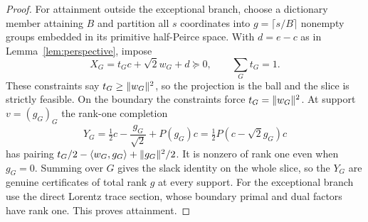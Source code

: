\begin{proof}
For attainment outside the exceptional branch, choose a dictionary member
attaining $B$ and partition all $s$ coordinates into
$g=\lceil s/B\rceil$ nonempty groups embedded in its primitive half-Peirce
space. With $d=e-c$ as in Lemma~\ref{lem:perspective}, impose
\begin{equation}\label{eq:fixed-tail}
 X_G=t_Gc+\sqrt2 w_G+d\succeq0,
 \qquad\sum_Gt_G=1.
\end{equation}
These constraints say $t_G\geq\lVert w_G\rVert^2$, so the projection is the
ball and the slice is strictly feasible. On the boundary the constraints
force $t_G=\lVert w_G\rVert^2$. At support $v=(g_G)_G$ the rank-one completion
\[
 Y_G=\tfrac12 c-\frac{g_G}{\sqrt2}+P(g_G)c
     =\tfrac12 P(c-\sqrt2 g_G)c
\]
has pairing $t_G/2-\langle w_G,g_G\rangle+\lVert g_G\rVert^2/2$.
It is nonzero of rank one even when $g_G=0$. Summing over $G$ gives the
slack identity on the whole slice, so the $Y_G$ are genuine
certificates of total rank $g$ at every support.
For the exceptional branch use the direct Lorentz trace section, whose
boundary primal and dual factors have rank one. This proves attainment.
\end{proof}


